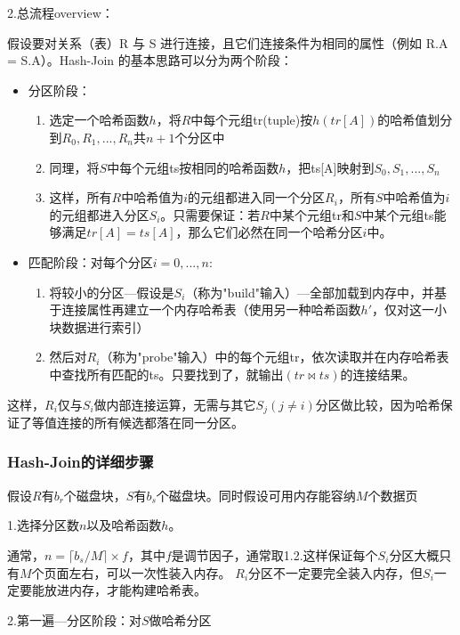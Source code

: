 2.总流程overview：

假设要对关系（表）R 与 S 进行连接，且它们连接条件为相同的属性（例如 R.A = S.A）。Hash-Join 的基本思路可以分为两个阶段：

\begin{itemize}
    \item 分区阶段：
       \begin{enumerate}
          \item 选定一个哈希函数$h$，将$R$中每个元组tr(tuple)按$h(tr[A])$的哈希值划分到$R_0,R_1,...,R_n$共$n+1$个分区中
          \item 同理，将$S$中每个元组ts按相同的哈希函数$h$，把ts[A]映射到$S_0,S_1,...,S_n$
          \item 这样，所有$R$中哈希值为$i$的元组都进入同一个分区$R_i$，所有$S$中哈希值为$i$的元组都进入分区$S_i$。只需要保证：若$R$中某个元组tr和$S$中某个元组ts能够满足$tr[A]=ts[A]$，那么它们必然在同一个哈希分区$i$中。
       \end{enumerate}
    \item 匹配阶段：对每个分区$i=0,...,n$:
       \begin{enumerate}
          \item 将较小的分区---假设是$S_i$（称为"build"输入）---全部加载到内存中，并基于连接属性再建立一个内存哈希表（使用另一种哈希函数$h'$，仅对这一小块数据进行索引）
          \item 然后对$R_i$（称为"probe"输入）中的每个元组tr，依次读取并在内存哈希表中查找所有匹配的ts。只要找到了，就输出$(tr\Join ts)$的连接结果。
       \end{enumerate}
\end{itemize}

这样，$R_i$仅与$S_i$做内部连接运算，无需与其它$S_j(j\neq i)$分区做比较，因为哈希保证了等值连接的所有候选都落在同一分区。

\subsubsection{Hash-Join的详细步骤}

假设$R$有$b_r$个磁盘块，$S$有$b_s$个磁盘块。同时假设可用内存能容纳$M$个数据页

\noindent 1.选择分区数$n$以及哈希函数$h$。

通常，$n=\lceil b_s/M \rceil\times f$，其中$f$是调节因子，通常取1.2.这样保证每个$S_i$分区大概只有$M$个页面左右，可以一次性装入内存。
$R_i$分区不一定要完全装入内存，但$S_i$一定要能放进内存，才能构建哈希表。

\noindent 2.第一遍---分区阶段：对$S$做哈希分区

